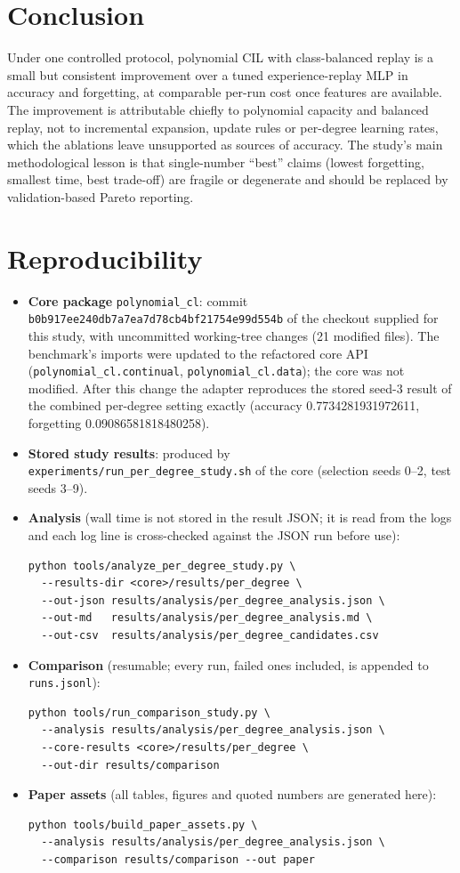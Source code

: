 \documentclass[11pt,a4paper]{article}
\begin{document}
\section{Conclusion}
Under one controlled protocol, polynomial CIL with class-balanced replay is a small but consistent improvement over a tuned experience-replay MLP in accuracy and forgetting, at comparable per-run cost once features are available. The improvement is attributable chiefly to polynomial capacity and balanced replay, not to incremental expansion, update rules or per-degree learning rates, which the ablations leave unsupported as sources of accuracy. The study's main methodological lesson is that single-number ``best'' claims (lowest forgetting, smallest time, best trade-off) are fragile or degenerate and should be replaced by validation-based Pareto reporting.

\appendix
\section{Reproducibility}
\begin{itemize}
\item \textbf{Core package} \texttt{polynomial\_cl}: commit \texttt{b0b917ee240db7a7ea7d78cb4bf21754e99d554b} of the checkout supplied for this study, with uncommitted working-tree changes (21 modified files). The benchmark's imports were updated to the refactored core API (\texttt{polynomial\_cl.continual}, \texttt{polynomial\_cl.data}); the core was not modified. After this change the adapter reproduces the stored seed-3 result of the combined per-degree setting exactly (accuracy 0.7734281931972611, forgetting 0.09086581818480258).
\item \textbf{Stored study results}: produced by \texttt{experiments/run\_per\_degree\_study.sh} of the core (selection seeds 0--2, test seeds 3--9).
\item \textbf{Analysis} (wall time is not stored in the result JSON; it is read from the logs and each log line is cross-checked against the JSON run before use):
\begin{verbatim}
python tools/analyze_per_degree_study.py \
  --results-dir <core>/results/per_degree \
  --out-json results/analysis/per_degree_analysis.json \
  --out-md   results/analysis/per_degree_analysis.md \
  --out-csv  results/analysis/per_degree_candidates.csv
\end{verbatim}
\item \textbf{Comparison} (resumable; every run, failed ones included, is appended to \texttt{runs.jsonl}):
\begin{verbatim}
python tools/run_comparison_study.py \
  --analysis results/analysis/per_degree_analysis.json \
  --core-results <core>/results/per_degree \
  --out-dir results/comparison
\end{verbatim}
\item \textbf{Paper assets} (all tables, figures and quoted numbers are generated here):
\begin{verbatim}
python tools/build_paper_assets.py \
  --analysis results/analysis/per_degree_analysis.json \
  --comparison results/comparison --out paper
\end{verbatim}
\end{itemize}
\end{document}
